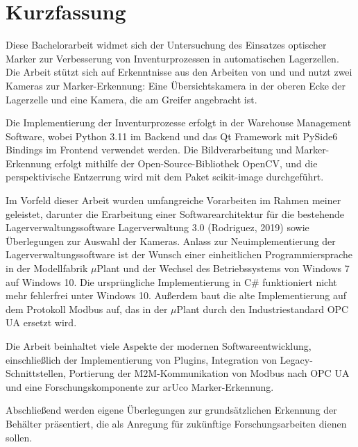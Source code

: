 ﻿%

\chapter*{Kurzfassung}

Diese Bachelorarbeit widmet sich der Untersuchung des Einsatzes optischer Marker zur Verbesserung von Inventurprozessen in automatischen Lagerzellen. 
Die Arbeit stützt sich auf Erkenntnisse aus den Arbeiten von \cite[Hübler (2019)]{Hübler2019} und \cite[Kistner (2017)]{LarsKistner2017}
und nutzt zwei Kameras zur Marker-Erkennung: Eine Übersichtskamera in der oberen Ecke der Lagerzelle und eine Kamera, die am Greifer angebracht ist.

Die Implementierung der Inventurprozesse erfolgt in der Warehouse Management Software, wobei Python 3.11 im Backend und das Qt Framework mit PySide6 Bindings im Frontend verwendet werden. 
Die Bildverarbeitung und Marker-Erkennung erfolgt mithilfe der Open-Source-Bibliothek OpenCV, und die perspektivische 
Entzerrung wird mit dem Paket scikit-image durchgeführt.

Im Vorfeld dieser Arbeit wurden umfangreiche Vorarbeiten im Rahmen meiner \cite[Semesterarbeit]{Semesterarbeit} geleistet, 
darunter die Erarbeitung einer Softwarearchitektur für die bestehende Lagerverwaltungssoftware Lagerverwaltung 3.0 (Rodriguez, 2019) 
sowie Überlegungen zur Auswahl der Kameras. Anlass zur Neuimplementierung der Lagerverwaltungssoftware ist der Wunsch einer 
einheitlichen Programmiersprache in der Modellfabrik $\mu$Plant und der Wechsel des Betriebssystems von Windows 7 auf Windows 10.
Die ursprüngliche Implementierung in C$\#$ funktioniert nicht mehr fehlerfrei unter Windows 10.
Außerdem baut die alte Implementierung auf dem Protokoll Modbus auf, das in der $\mu$Plant durch den Industriestandard OPC UA ersetzt wird.

Die Arbeit beinhaltet viele Aspekte der modernen Softwareentwicklung, einschließlich der Implementierung von Plugins, 
Integration von Legacy-Schnittstellen, Portierung der M2M-Kommunikation von Modbus nach OPC UA und eine Forschungskomponente zur arUco Marker-Erkennung. 

Abschließend werden eigene Überlegungen zur grundsätzlichen Erkennung der Behälter präsentiert, 
die als Anregung für zukünftige Forschungsarbeiten dienen sollen.



